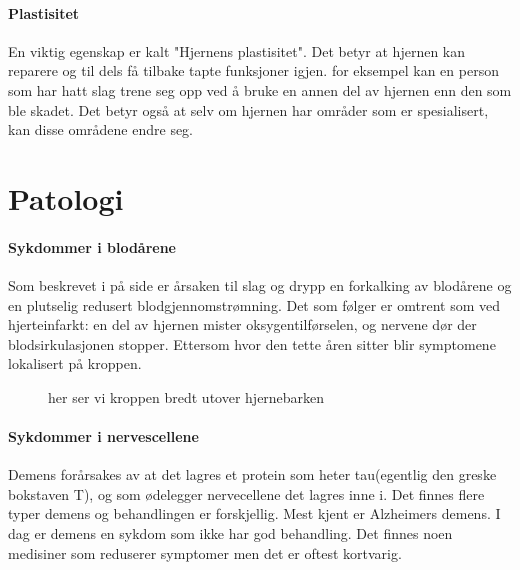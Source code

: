 			\paragraph{Plastisitet\\}
				En viktig egenskap er kalt "Hjernens plastisitet". Det betyr at hjernen kan reparere og til dels få tilbake tapte funksjoner igjen. for eksempel kan en person som har hatt slag trene seg opp ved å bruke en annen del av hjernen enn den som ble skadet. Det betyr også at selv om hjernen har områder som er spesialisert, kan disse områdene endre seg.
		\section{Patologi}
			\paragraph{Sykdommer i blodårene\\}
				Som beskrevet i  på side \pageref{sec:athero} %
				er årsaken til slag og drypp en forkalking av blodårene og en plutselig redusert blodgjennomstrømning\cite{FA-athero}. Det som følger er omtrent som ved hjerteinfarkt: en del av hjernen mister oksygentilførselen, og nervene dør der blodsirkulasjonen stopper. Ettersom hvor den tette åren sitter blir symptomene lokalisert på kroppen.
					\begin{figure}[ht]
                      \centering
                      \caption{her ser vi kroppen bredt utover hjernebarken}
                    \end{figure}
			\paragraph{Sykdommer i nervescellene\\}
				Demens forårsakes av at det lagres et protein som heter tau(egentlig den greske bokstaven T), og som ødelegger nervecellene det lagres inne i. Det finnes flere typer demens og behandlingen er forskjellig. Mest kjent er Alzheimers demens. I dag er demens en sykdom som ikke har god behandling. Det finnes noen medisiner som reduserer symptomer men det er oftest kortvarig. 
